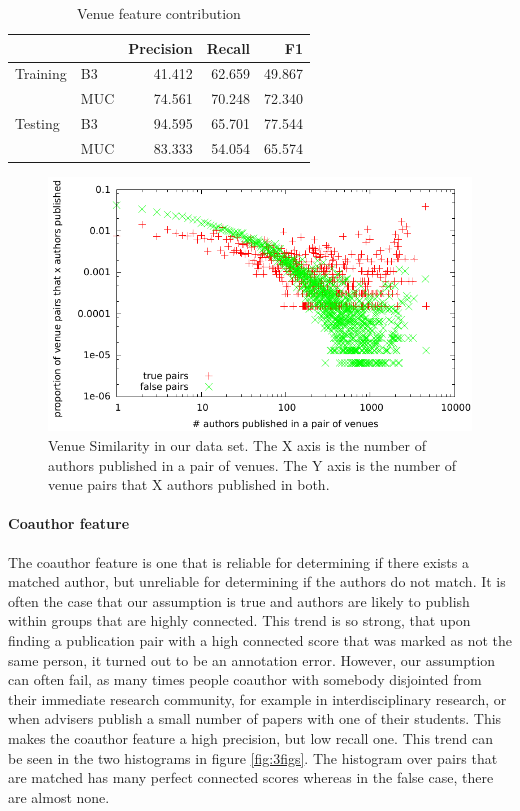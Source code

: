 \documentclass[twocolumn,letterpaper]{article}
\begin{document}
\begin{table}
\begin{tabular}{l || l | r r r}
 & & Precision & Recall & F1 \\ \hline
Training & B3 & 41.412 & 62.659 & 49.867 \\
 & MUC & 74.561 & 70.248 & 72.340\\ \hline
Testing & B3 & 94.595 & 65.701 & 77.544 \\
 & MUC & 83.333 & 54.054 & 65.574 \\
\end{tabular}
\caption{Venue feature contribution}
\label{tab:venue}
\end{table}

\begin{figure}
  \centering
  \includegraphics[width=\columnwidth]{venuestat_dataset}
  \caption{Venue Similarity in our data set.  The X axis is the number of authors published in a pair of venues.  The Y axis is the number of venue pairs that X authors published in both.}
  \label{fig:venuedataset}
\end{figure}

\paragraph{Coauthor feature} %
\label{par:coauthor_feature}
The coauthor feature is one that is reliable for determining if there exists a matched author, but unreliable for determining if the authors do not match. It is often the case that our assumption is true and authors are likely to publish within groups that are highly connected. This trend is so strong, that upon finding a publication pair with a high connected score that was marked as not the same person, it turned out to be an annotation error. However, our assumption can often fail, as many times people coauthor with somebody disjointed from their immediate research community, for example in interdisciplinary research, or when advisers publish a small number of papers with one of their students. This makes the coauthor feature a high precision, but low recall one. This trend can be seen in the two histograms in figure \ref{fig:3figs}. The histogram over pairs that are matched has many perfect connected scores whereas in the false case, there are almost none. 
\end{document}
